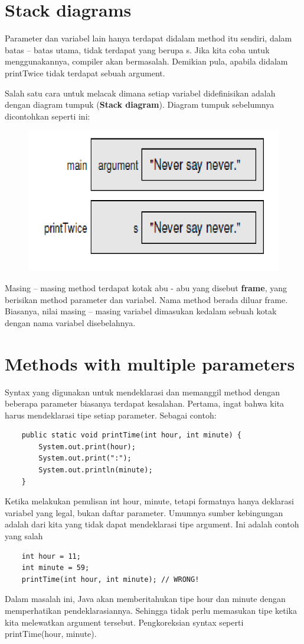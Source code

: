 \section{Stack diagrams}
Parameter dan variabel lain hanya terdapat didalam method itu sendiri, dalam batas – batas utama, tidak terdapat yang berupa s. Jika kita coba untuk menggunakannya, compiler akan bermasalah. Demikian pula, apabila didalam printTwice tidak terdapat sebuah argument.

Salah satu cara untuk melacak dimana setiap variabel didefinisikan adalah dengan diagram tumpuk (\textbf {Stack diagram}). Diagram tumpuk sebelumnya dicontohkan seperti ini:
\newline
\newline
\begin{figure}[h]
\centering
\includegraphics[width=0.4\linewidth]{stackDiagrams.png}
\label{fig:stackDiagrams.png}
\end{figure}
\newline
\newline
Masing – masing method terdapat kotak abu - abu yang disebut \textbf{frame}, yang berisikan method parameter dan variabel. Nama method berada diluar frame. Biasanya, nilai masing – masing variabel dimasukan kedalam sebuah kotak dengan nama variabel disebelahnya.

\section{Methods with multiple parameters}
Syntax yang digunakan untuk mendeklarasi dan memanggil method dengan beberapa parameter biasanya terdapat kesalahan. Pertama, ingat bahwa kita harus mendeklarasi tipe setiap parameter. Sebagai contoh:
\begin{lstlisting}
	public static void printTime(int hour, int minute) {
		System.out.print(hour);
		System.out.print(":");
		System.out.println(minute);
	} 
\end{lstlisting}
Ketika melakukan penulisan int hour, minute, tetapi formatnya hanya deklarasi variabel yang legal, bukan daftar parameter.
\newline
\newline
Umumnya sumber kebingungan adalah dari kita yang tidak dapat mendeklarasi tipe argument. Ini adalah contoh yang salah
\begin{lstlisting}
	int hour = 11;
	int minute = 59;
	printTime(int hour, int minute); // WRONG!
\end{lstlisting}
Dalam masalah ini, Java akan memberitahukan tipe hour dan minute dengan memperhatikan pendeklarasiannya. Sehingga tidak perlu memasukan tipe ketika kita melewatkan argument tersebut. Pengkoreksian syntax seperti printTime(hour, minute).

